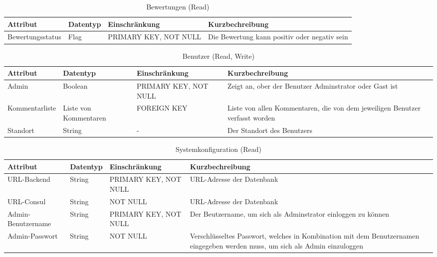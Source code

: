        \begin{table}
         \centering
         \begin{tabularx}{\textwidth}{ X | X | X | X} 
           \textbf{Attribut}  & \textbf{Datentyp} & \textbf{Einschränkung} & \textbf{Kurzbechreibung} \\ \hline \hline
           Bewertungsstatus & Flag & PRIMARY KEY, NOT NULL 
           & Die Bewertung kann positiv oder negativ sein\\ \hline                                    
         \end{tabularx}
            
         \caption{Bewertungen (Read)}
    
       \end{table}

       \begin{table}
         \centering
         \begin{tabularx}{\textwidth}{ X | X | X | X} 
           \textbf{Attribut}  & \textbf{Datentyp} & \textbf{Einschränkung} & \textbf{Kurzbechreibung} \\ \hline \hline
           Admin & Boolean & PRIMARY KEY, NOT NULL 
           & Zeigt an, ober der Benutzer Adminstrator oder Gast ist\\ \hline 
           Kommentarliste & Liste von Kommentaren  & FOREIGN KEY
           & Liste von allen Kommentaren, die von dem jeweiligen Benutzer verfasst worden \\ \hline
           Standort & String & - & Der Standort des Benutzers \\ \hline
                   
         \end{tabularx}
            
         \caption{Benutzer (Read, Write)}
    
       \end{table}

        \begin{table}
         \centering
         \begin{tabularx}{\textwidth}{ X | X | X | X} 
           \textbf{Attribut}  & \textbf{Datentyp} & \textbf{Einschränkung} & \textbf{Kurzbechreibung} \\ \hline \hline
           URL-Backend & String & PRIMARY KEY, NOT NULL 
           & URL-Adresse der Datenbank\\ \hline
           URL-Consul & String & NOT NULL 
           & URL-Adresse der Datenbank\\ \hline
           Admin-Benutzername & String & PRIMARY KEY, NOT NULL & Der Beutzername, um sich als Adminstrator einloggen zu können \\ \hline
           Admin-Passwort & String & NOT NULL & Verschlüsseltes Passwort, welches in Kombination mit dem Benutzernamen eingegeben werden muss, um sich als Admin einzuloggen \\ \hline
         \end{tabularx}
            
         \caption{Systemkonfiguration (Read)}
    
       \end{table}
